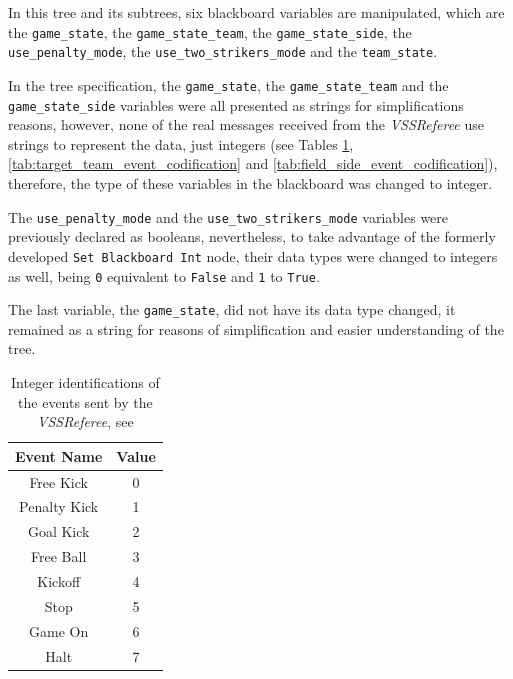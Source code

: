 In this tree and its subtrees, six blackboard variables are manipulated, which are the \texttt{game\_state}, the \texttt{game\_state\_team}, the \texttt{game\_state\_side}, the \texttt{use\_penalty\_mode}, the \texttt{use\_two\_strikers\_mode} and the \texttt{team\_state}. 

In the tree specification, the \texttt{game\_state}, the \texttt{game\_state\_team} and the \texttt{game\_state\_side} variables were all presented as strings for simplifications reasons, however, none of the real messages received from the \textit{VSSReferee} use strings to represent the data, just integers (see Tables \ref{tab:referee_events_ids}, \ref{tab:target_team_event_codification} and \ref{tab:field_side_event_codification}), therefore, the type of these variables in the blackboard was changed to integer. 

The \texttt{use\_penalty\_mode} and the \texttt{use\_two\_strikers\_mode} variables were previously declared as booleans, nevertheless, to take advantage of the formerly developed \texttt{Set Blackboard Int} node, their data types were changed to integers as well, being \texttt{0} equivalent to \texttt{False} and \texttt{1} to \texttt{True}. 

The last variable, the \texttt{game\_state}, did not have its data type changed, it remained as a string for reasons of simplification and easier understanding of the tree.

\begin{table}[!htbp]
    \centering
    \begin{tabular}{c c}
        \toprule
        Event Name   & Value \\ 
        \midrule
        Free Kick    & 0     \\ 
        Penalty Kick & 1     \\ 
        Goal Kick    & 2     \\ 
        Free Ball    & 3     \\ 
        Kickoff      & 4     \\ 
        Stop         & 5     \\ 
        Game On      & 6     \\ 
        Halt         & 7     \\ 
        \bottomrule
    \end{tabular}
    \caption{Integer identifications of the events sent by the \textit{VSSReferee}, see \cite{VSSProto}}
    \label{tab:referee_events_ids}
\end{table}

